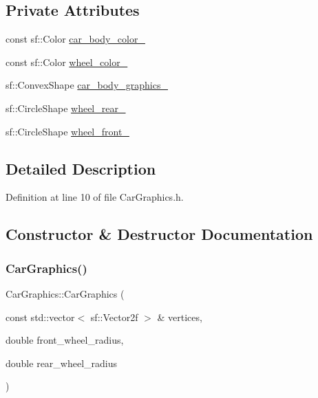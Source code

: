 \subsection*{Private Attributes}
\begin{DoxyCompactItemize}
\item 
const sf\+::\+Color \hyperlink{classCarGraphics_a3df8d600a272817a5c521cdc8c23c587}{car\+\_\+body\+\_\+color\+\_\+}
\item 
const sf\+::\+Color \hyperlink{classCarGraphics_adc369f5f948025767d40f2ad40e2568a}{wheel\+\_\+color\+\_\+}
\item 
sf\+::\+Convex\+Shape \hyperlink{classCarGraphics_a4e1969ef5f4326f10b83b1488484f660}{car\+\_\+body\+\_\+graphics\+\_\+}
\item 
sf\+::\+Circle\+Shape \hyperlink{classCarGraphics_a2a66d0c60b79f54a807a31afd76c4ad1}{wheel\+\_\+rear\+\_\+}
\item 
sf\+::\+Circle\+Shape \hyperlink{classCarGraphics_a2e004e7f0288f6ed1352ba9116b4d112}{wheel\+\_\+front\+\_\+}
\end{DoxyCompactItemize}


\subsection{Detailed Description}


Definition at line 10 of file Car\+Graphics.\+h.



\subsection{Constructor \& Destructor Documentation}
\mbox{\label{classCarGraphics_a37c8d0d08003f0a84495a3aedfe471db}} 
\subsubsection{\texorpdfstring{Car\+Graphics()}{CarGraphics()}}
{\footnotesize\ttfamily Car\+Graphics\+::\+Car\+Graphics (\begin{DoxyParamCaption}\item[{const std\+::vector$<$ sf\+::\+Vector2f $>$ \&}]{vertices,  }\item[{double}]{front\+\_\+wheel\+\_\+radius,  }\item[{double}]{rear\+\_\+wheel\+\_\+radius }\end{DoxyParamCaption})}



